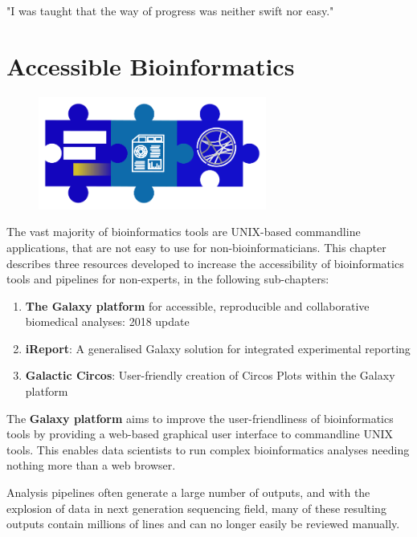 \begin{savequote}[75mm]
"I was taught that the way of progress was neither swift nor easy."
\end{savequote}

\chapter{Accessible Bioinformatics}\label{chapter:general}
\setcounter{figure}{-1}
\setcounter{table}{-1}
\setcounter{section}{-1}
\setcounter{NAT@ctr}{-1}

\begin{figure}[t!]
\includegraphics[height=10em]{frontmatter/images/chapter-header-technical.png}
\end{figure}
\setcounter{figure}{-1}
\setcounter{table}{-1}
\setcounter{section}{-1}

The vast majority of bioinformatics tools are UNIX-based commandline applications, that are not easy to use for non-bioinformaticians. This chapter describes three resources developed to increase the accessibility of bioinformatics tools and pipelines for non-experts, in the following sub-chapters:

\begin{enumerate}
\itemsep-0.5em
\item \textbf{The Galaxy platform} for accessible, reproducible and collaborative biomedical analyses: 2018 update
\item \textbf{iReport}: A generalised Galaxy solution for integrated experimental reporting
\item \textbf{Galactic Circos}: User-friendly creation of Circos Plots within the Galaxy platform
\end{enumerate}

The \textbf{Galaxy platform} aims to improve the user-friendliness of bioinformatics tools by providing a web-based graphical user interface to commandline UNIX tools. This enables data scientists to run complex bioinformatics analyses needing nothing more than a web browser.

Analysis pipelines often generate a large number of outputs, and with the explosion of data in next generation sequencing field, many of these resulting outputs contain millions of lines and can no longer easily be reviewed manually.

